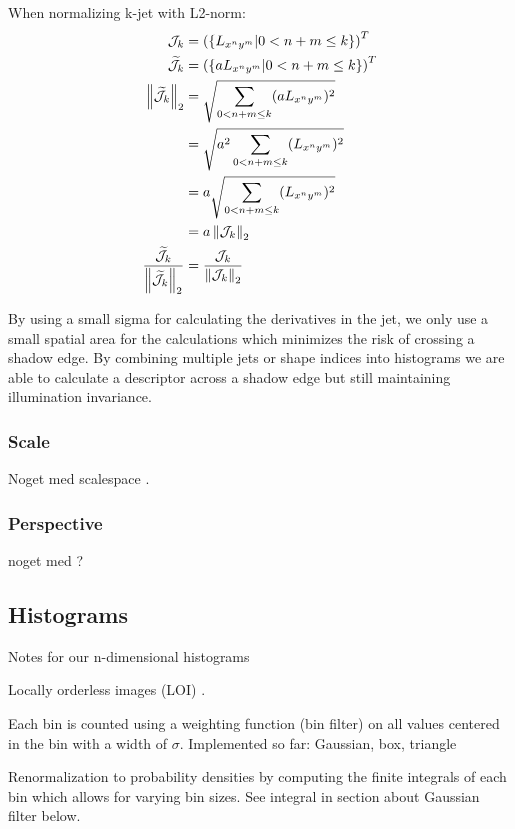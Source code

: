 \documentclass[../thesis.tex]{subfiles}
\begin{document}
When normalizing k-jet with L2-norm:
\begin{align}
  \mathcal{J}_k &= \left( \left \lbrace L_{x^n y^m} | 0 < n+m \leq k \right \rbrace \right)^T \\
  \widetilde{\mathcal{J}}_k &=\left( \left \lbrace a L_{x^n y^m} | 0 < n+m \leq k \right \rbrace \right)^T \\
  \left \| \widetilde{\mathcal{J}}_k \right \|_2 &= \sqrt{\sum_{0 < n+m \leq k} (a L_{x^n y^m})^2} \\
      &= \sqrt{a^2\sum_{0 < n+m \leq k} (L_{x^n y^m})^2} \\
      &= a\sqrt{\sum_{0 < n+m \leq k} (L_{x^n y^m})^2} \\
      &= a \left \| \mathcal{J}_k \right \|_2 \\
  \frac{\widetilde{\mathcal{J}}_k}{\left \| \widetilde{\mathcal{J}}_k \right \|_2} &=
      \frac{\mathcal{J}_k}{\left \| \mathcal{J}_k \right \|_2}
\end{align}

By using a small sigma for calculating the derivatives in the jet, we only use a small spatial area for the calculations which minimizes the risk of crossing a shadow edge. By combining multiple jets or shape indices into histograms we are able to calculate a descriptor across a shadow edge but still maintaining illumination invariance.

\subsubsection{Scale}
Noget med scalespace \cite{griffin1997scale}.

\subsubsection{Perspective}
noget med ?

\subsection{Histograms}

Notes for our n-dimensional histograms

Locally orderless images (LOI) \cite{koenderink1999structure}.

Each bin is counted using a weighting function (bin filter) on all values centered in the bin with a width of $\sigma$.
Implemented so far: Gaussian, box, triangle

Renormalization to probability densities by computing the finite integrals of each bin which allows for varying bin sizes. See integral in section about Gaussian filter below.
\end{document}
